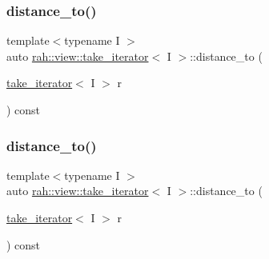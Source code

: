 \subsubsection{\texorpdfstring{distance\_to()}{distance\_to()}\hspace{0.1cm}{\footnotesize\ttfamily [1/2]}}
{\footnotesize\ttfamily template$<$typename I $>$ \\
auto \mbox{\hyperlink{structrah_1_1view_1_1take__iterator}{rah\+::view\+::take\+\_\+iterator}}$<$ I $>$\+::distance\+\_\+to (\begin{DoxyParamCaption}\item[{\mbox{\hyperlink{structrah_1_1view_1_1take__iterator}{take\+\_\+iterator}}$<$ I $>$}]{r }\end{DoxyParamCaption}) const\hspace{0.3cm}{\ttfamily [inline]}}

\mbox{\label{structrah_1_1view_1_1take__iterator_a6516d99883863b621df6717bf1d4613b}} 
\subsubsection{\texorpdfstring{distance\_to()}{distance\_to()}\hspace{0.1cm}{\footnotesize\ttfamily [2/2]}}
{\footnotesize\ttfamily template$<$typename I $>$ \\
auto \mbox{\hyperlink{structrah_1_1view_1_1take__iterator}{rah\+::view\+::take\+\_\+iterator}}$<$ I $>$\+::distance\+\_\+to (\begin{DoxyParamCaption}\item[{\mbox{\hyperlink{structrah_1_1view_1_1take__iterator}{take\+\_\+iterator}}$<$ I $>$}]{r }\end{DoxyParamCaption}) const\hspace{0.3cm}{\ttfamily [inline]}}

\mbox{\label{structrah_1_1view_1_1take__iterator_a222e31de32a4780e1f0f0f6d9d963ded}} 
